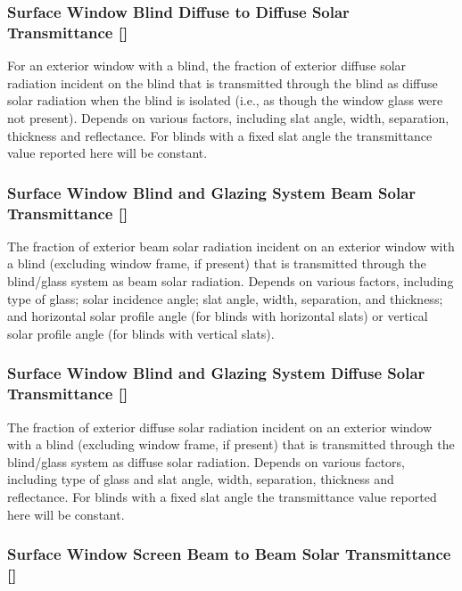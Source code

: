 \subsubsection{Surface Window Blind Diffuse to Diffuse Solar Transmittance {[]}}\label{surface-window-blind-diffuse-to-diffuse-solar-transmittance}

For an exterior window with a blind, the fraction of exterior diffuse solar radiation incident on the blind that is transmitted through the blind as diffuse solar radiation when the blind is isolated (i.e., as though the window glass were not present). Depends on various factors, including slat angle, width, separation, thickness and reflectance. For blinds with a fixed slat angle the transmittance value reported here will be constant.

\subsubsection{Surface Window Blind and Glazing System Beam Solar Transmittance {[]}}\label{surface-window-blind-and-glazing-system-beam-solar-transmittance}

The fraction of exterior beam solar radiation incident on an exterior window with a blind (excluding window frame, if present) that is transmitted through the blind/glass system as beam solar radiation. Depends on various factors, including type of glass; solar incidence angle; slat angle, width, separation, and thickness; and horizontal solar profile angle (for blinds with horizontal slats) or vertical solar profile angle (for blinds with vertical slats).

\subsubsection{Surface Window Blind and Glazing System Diffuse Solar Transmittance {[]}}\label{surface-window-blind-and-glazing-system-diffuse-solar-transmittance}

The fraction of exterior diffuse solar radiation incident on an exterior window with a blind (excluding window frame, if present) that is transmitted through the blind/glass system as diffuse solar radiation. Depends on various factors, including type of glass and slat angle, width, separation, thickness and reflectance. For blinds with a fixed slat angle the transmittance value reported here will be constant.

\subsubsection{Surface Window Screen Beam to Beam Solar Transmittance {[]}}\label{surface-window-screen-beam-to-beam-solar-transmittance}

